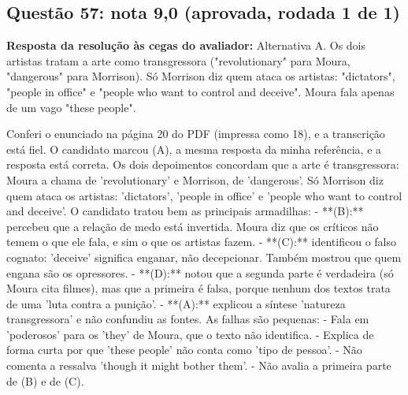 \documentclass{article}%
\begin{document}
\subsection*{Questão 57: nota 9,0 (aprovada, rodada 1 de 1)}%
\textbf{Resposta da resolução às cegas do avaliador:} Alternativa A. Os dois artistas tratam a arte como transgressora ("revolutionary" para Moura, "dangerous" para Morrison). Só Morrison diz quem ataca os artistas: "dictators", "people in office" e "people who want to control and deceive". Moura fala apenas de um vago "these people".\par %
Conferi o enunciado na página 20 do PDF (impressa como 18), e a transcrição está fiel. O candidato marcou (A), a mesma resposta da minha referência, e a resposta está correta.\newline%
\newline%
Os dois depoimentos concordam que a arte é transgressora: Moura a chama de 'revolutionary' e Morrison, de 'dangerous'. Só Morrison diz quem ataca os artistas: 'dictators', 'people in office' e 'people who want to control and deceive'.\newline%
\newline%
O candidato tratou bem as principais armadilhas:\newline%
{-} **(B):** percebeu que a relação de medo está invertida. Moura diz que os críticos não temem o que ele fala, e sim o que os artistas fazem.\newline%
{-} **(C):** identificou o falso cognato: 'deceive' significa enganar, não decepcionar. Também mostrou que quem engana são os opressores.\newline%
{-} **(D):** notou que a segunda parte é verdadeira (só Moura cita filmes), mas que a primeira é falsa, porque nenhum dos textos trata de uma 'luta contra a punição'.\newline%
{-} **(A):** explicou a síntese 'natureza transgressora' e não confundiu as fontes.\newline%
\newline%
As falhas são pequenas:\newline%
{-} Fala em 'poderosos' para os 'they' de Moura, que o texto não identifica.\newline%
{-} Explica de forma curta por que 'these people' não conta como 'tipo de pessoa'.\newline%
{-} Não comenta a ressalva 'though it might bother them'.\newline%
{-} Não avalia a primeira parte de (B) e de (C).\newline%
\end{document}
